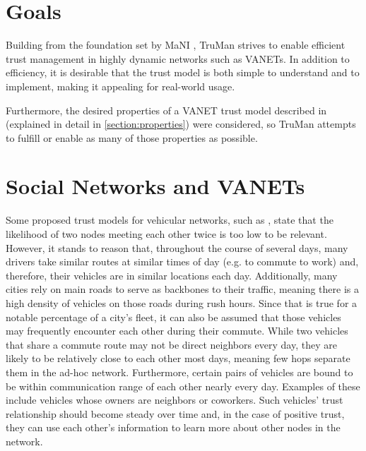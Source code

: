 \section{Goals}
\label{section:goals}
Building from the foundation set by MaNI \citep{vernize2013dissertation}, TruMan strives to enable efficient trust management in highly dynamic networks such as VANETs.
In addition to efficiency, it is desirable that the trust model is both simple to understand and to implement, making it appealing for real-world usage.

Furthermore, the desired properties of a VANET trust model described in \citep{zhang2011survey} (explained in detail in \autoref{section:properties}) were considered, so TruMan attempts to fulfill or enable as many of those properties as possible.

\section{Social Networks and VANETs}
\label{section:socialvanets}
Some proposed trust models for vehicular networks, such as \citep{huang2014social}, state that the likelihood of two nodes meeting each other twice is too low to be relevant.
However, it stands to reason that, throughout the course of several days, many drivers take similar routes at similar times of day (e.g. to commute to work) and, therefore, their vehicles are in similar locations each day.
Additionally, many cities rely on main roads to serve as backbones to their traffic, meaning there is a high density of vehicles on those roads during rush hours.
Since that is true for a notable percentage of a city's fleet, it can also be assumed that those vehicles may frequently encounter each other during their commute.
While two vehicles that share a commute route may not be direct neighbors every day, they are likely to be relatively close to each other most days, meaning few hops separate them in the ad-hoc network.
Furthermore, certain pairs of vehicles are bound to be within communication range of each other nearly every day.
Examples of these include vehicles whose owners are neighbors or coworkers.
Such vehicles' trust relationship should become steady over time and, in the case of positive trust, they can use each other's information to learn more about other nodes in the network.


